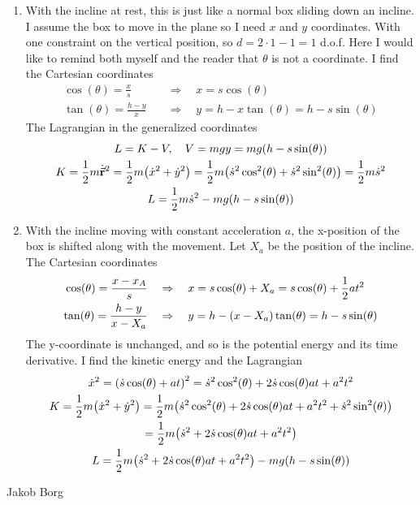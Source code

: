 \documentclass[11pt,a4paper]{report}
\newcounter{excount}[chapter]
\newenvironment{exercise}[1][]{\addtocounter{excount}{1} \noindent {\bf Problem
    \arabic{excount} \ \ #1}\hspace{2mm}}{\vspace{4mm}}
\newenvironment{solution}
    {\begin{tcolorbox}[title=Solution,halign lower=right,breakable]
    }
    {
    \tcblower Jakob Borg
    \end{tcolorbox}
	\vspace{5mm}
    }
\newcommand{\half}
{
\frac{1}{2}
}
\newcommand{\Lpdv}[1]
{
\pdv{L}{#1}
}
\newcommand{\cost}
{
\cos(\theta)
}
\newcommand{\sint}
{
\sin(\theta)
}
\begin{document}
\begin{exercise}
\begin{solution}
\begin{enumerate}[\bf a)]
\item With the incline at rest, this is just like a normal box sliding down an incline. I assume the box to move in the plane so I need $x$ and $y$ coordinates. With one constraint on the vertical position, so $ d = 2\cdot 1 - 1 = 1$ d.o.f. Here I would like to remind both myself and the reader that $\theta$ is not a coordinate. I find the Cartesian coordinates
\begin{align*}
\cost = \frac{x}{s} \quad  &\Rightarrow \quad x = s\cost
\\
\tan(\theta) = \frac{h-y}{x}  \quad &\Rightarrow \quad  y = h - x \tan(\theta) = h- s\sint
\end{align*}
The Lagrangian in the generalized coordinates
\begin{gather*}
L = K-V \qc V = mgy = mg\qty( h-s\sint)
\\
K = \half m\dot{\va{r}}^2 = \half m \qty( \dot{x}^2 + \dot{y}^2 ) = \half m \qty( \dot{s}^2 \cos[2](\theta) + \dot{s}^2\sin[2](\theta)) = \half m\dot{s}^2
\\
L = \half m\dot{s}^2 - mg\qty(h-s\sint)
\end{gather*}

\item With the incline moving with constant acceleration $a$, the x-position of the box is shifted along with the movement. Let $X_a$ be the position of the incline. The Cartesian coordinates
\begin{align*}
\cost = \frac{x - x_A}{s} \quad &\Rightarrow \quad x =  s\cost + X_a = s\cost + \half a t^2
\\
\tan(\theta) = \frac{h-y}{x-X_a} \quad &\Rightarrow \quad y = h-\qty(x-X_a)\tan(\theta) = h-s\sint
\end{align*}
The y-coordinate is unchanged, and so is the potential energy and its time derivative. I find the kinetic energy and the Lagrangian
\begin{gather*}
\dot{x}^2 = \qty( \dot{s}\cost + at ) ^2 = \dot{s}^2\cos[2](\theta) + 2\dot{s}\cost at + a^2t^2
\\
K = \half m\qty( \dot{x}^2 + \dot{y}^2 ) = \half m \qty( \dot{s}^2\cos[2](\theta) + 2\dot{s}\cost at + a^2t^2 + \dot{s}^2\sin[2](\theta) )
\\
= \half m \qty( \dot{s}^2 + 2\dot{s}\cost at + a^2t^2)
\\
L = \half m \qty( \dot{s}^2 + 2\dot{s}\cost at + a^2t^2) - mg\qty( h-s\sint)
\end{gather*}


\end{enumerate}
\end{solution}
\end{exercise}
\end{document}
